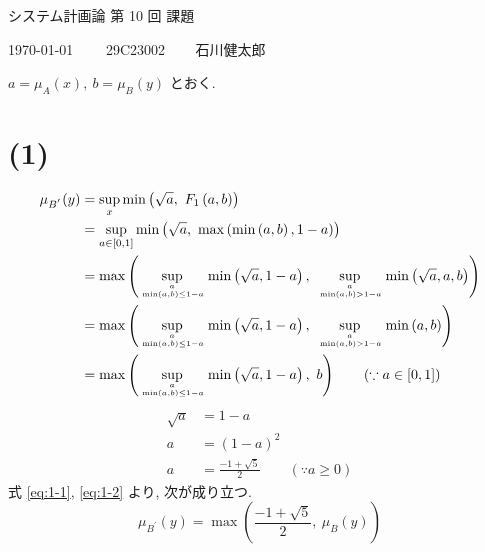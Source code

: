 \documentclass[uplatex, a4j, 10pt, fleqn, dvipdfmx]{article}
\newcommand{\substk}[2]{%
	#1 \atop \vphantom{#1} #2
}
\begin{document}
\begin{center}
	{\Huge システム計画論 第 10 回 課題}
\end{center}

\begin{flushright}
	{\Large \today ~~~~ 29C23002 ~~~ 石川健太郎}
\end{flushright}

$a = \mu_A(x), ~ b = \mu_B(y)$ とおく.

\section*{(1)}

\begin{align}
	\mu_{B^{'}}(y)
	 & = \sup_{x} \min \left( \sqrt{a}, ~ F_1 \left( a, b \right) \right) \nonumber                                                                                                                                       \\
	 & = \sup_{a \in [0, 1]} \min \left( \sqrt{a}, ~ \max \left( \min \left( a, b \right), 1 - a \right) \right) \nonumber                                                                                                \\
	 & = \max \left( \sup_{\substk{a}{\min \left( a, b \right) \leq 1 - a}} \min \left(\sqrt{a}, 1 - a \right), ~ \sup_{\substk{a}{\min \left( a, b \right) > 1 - a}} \min \left(\sqrt{a}, a, b \right) \right) \nonumber \\
	 & = \max \left( \sup_{\substk{a}{\min \left( a, b \right) \leq 1 - a}} \min \left(\sqrt{a}, 1 - a \right), ~ \sup_{\substk{a}{\min \left( a, b \right) > 1 - a}} \min \left(a, b \right) \right) \nonumber           \\
	 & = \max \left( \sup_{\substk{a}{\min \left( a, b \right) \leq 1 - a}} \min \left(\sqrt{a}, 1 - a \right), ~ b \right) \qquad (\because a \in [0, 1])
	\label{eq:1-1}
\end{align}
\begin{align}
	\sqrt{a} & = 1 - a \nonumber                                                  \\
	a        & = (1 - a)^2 \nonumber                                              \\
	a        & = \frac{-1 + \sqrt{5}}{2} \qquad \left( \because a \geq 0  \right)
	\label{eq:1-2}
\end{align}
式 \eqref{eq:1-1}, \eqref{eq:1-2} より, 次が成り立つ.
\begin{equation}
	\mu_{B^{'}}(y) = \max \left( \frac{-1 + \sqrt{5}}{2}, ~ \mu_B(y) \right)
\end{equation}
\end{document}
